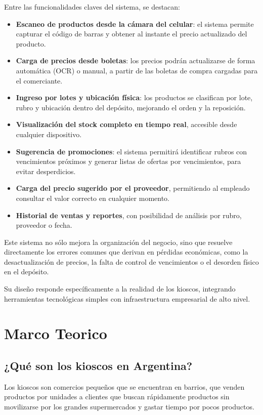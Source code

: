 \documentclass[twoside]{article}
\begin{document}
Entre las funcionalidades claves del sistema, se destacan:
\begin{itemize}
    \item \textbf{Escaneo de productos desde la cámara del celular}: el sistema permite capturar el código de barras y obtener al instante el precio actualizado del producto.
    \item \textbf{Carga de precios desde boletas}: los precios podrán actualizarse de forma automática (OCR) o manual, a partir de las boletas de compra cargadas para el comerciante.
    \item \textbf{Ingreso por lotes y ubicación física}: los productos se clasifican por lote, rubro y ubicación dentro del depósito, mejorando el orden y la reposición.
    \item \textbf{Visualización del stock completo en tiempo real}, accesible desde cualquier dispositivo.
    \item \textbf{Sugerencia de promociones}: el sistema permitirá identificar rubros con vencimientos próximos y generar listas de ofertas por vencimientos, para evitar desperdicios.
    \item \textbf{Carga del precio sugerido por el proveedor}, permitiendo al empleado consultar el valor correcto en cualquier momento.
    \item \textbf{Historial de ventas y reportes}, con posibilidad de análisis por rubro, proveedor o fecha.
\end{itemize}
Este sistema no sólo mejora la organización del negocio, sino que resuelve directamente los errores comunes que derivan en pérdidas económicas, como la desactualización de precios, la falta de control de vencimientos o el desorden físico en el depósito.\par
Su diseño responde específicamente a la realidad de los kioscos, integrando herramientas tecnológicas simples con infraestructura empresarial de alto nivel.


\section{Marco Teorico}

\subsection{¿Qué son los kioscos en Argentina?}
Los kioscos son comercios pequeños que se encuentran en barrios, que venden productos por unidades a clientes que buscan rápidamente productos sin movilizarse por los grandes supermercados y gastar tiempo por pocos productos. \\
\end{document}
